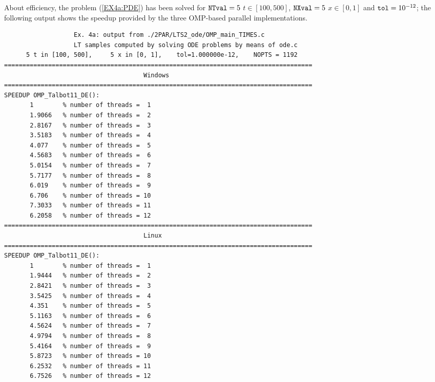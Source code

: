\documentclass[a4paper,10pt]{report}%
\begin{document}
About efficiency, the problem (\ref{EX4a:PDE}) has been solved for ${\tt NTval}=5$ $t\in[100, 500]$,
${\tt NXval}=5$ $x\in[0,1]$ and ${\tt tol}=10^{-12}$; the following output shows the speedup provided by the three
OMP-based parallel implementations.
\begin{lstlisting}
                   Ex. 4a: output from ./2PAR/LTS2_ode/OMP_main_TIMES.c
                   LT samples computed by solving ODE problems by means of ode.c
      5 t in [100, 500],     5 x in [0, 1],    tol=1.000000e-12,    NOPTS = 1192
====================================================================================
                                      Windows
====================================================================================
SPEEDUP OMP_Talbot11_DE():
       1        % number of threads =  1
       1.9066   % number of threads =  2
       2.8167   % number of threads =  3
       3.5183   % number of threads =  4
       4.077    % number of threads =  5
       4.5683   % number of threads =  6
       5.0154   % number of threads =  7
       5.7177   % number of threads =  8
       6.019    % number of threads =  9
       6.706    % number of threads = 10
       7.3033   % number of threads = 11
       6.2058   % number of threads = 12
====================================================================================
                                      Linux
====================================================================================
SPEEDUP OMP_Talbot11_DE():
       1        % number of threads =  1
       1.9444   % number of threads =  2
       2.8421   % number of threads =  3
       3.5425   % number of threads =  4
       4.351    % number of threads =  5
       5.1163   % number of threads =  6
       4.5624   % number of threads =  7
       4.9794   % number of threads =  8
       5.4164   % number of threads =  9
       5.8723   % number of threads = 10
       6.2532   % number of threads = 11
       6.7526   % number of threads = 12


\end{lstlisting}
\end{document}
